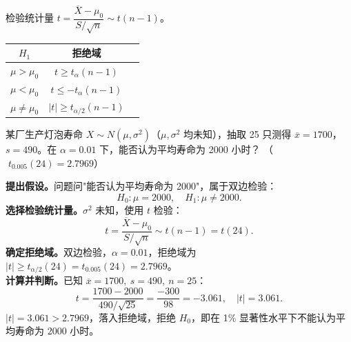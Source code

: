 ﻿\documentclass[lang=cn,11pt]{elegantbook}
\begin{document}
\begin{property}[t 检验（\(\sigma^2\) 未知）]\label{prop:t-test}
检验统计量 \(t = \dfrac{\overline{X}-\mu_0}{S/\sqrt{n}} \sim t(n-1)\)。
\begin{center}
\begin{tabular}{ccc}
\toprule
\(H_1\) & 拒绝域 \\
\midrule
\(\mu > \mu_0\) & \(t \geq t_\alpha(n-1)\) \\[4pt]
\(\mu < \mu_0\) & \(t \leq -t_\alpha(n-1)\) \\[4pt]
\(\mu \neq \mu_0\) & \(|t| \geq t_{\alpha/2}(n-1)\) \\
\bottomrule
\end{tabular}
\end{center}
\end{property}


\begin{exercise}\label{exer:9-t-test-two}
某厂生产灯泡寿命 \(X \sim N(\mu, \sigma^2)\)（\(\mu, \sigma^2\) 均未知），抽取 25 只测得 \(\overline{x}=1700\)，\(s=490\)。在 \(\alpha=0.01\) 下，能否认为平均寿命为 2000 小时？
（\(\;t_{0.005}(24)=2.7969\)）
\end{exercise}
\begin{solution}
\textbf{提出假设。}问题问"能否认为平均寿命为 2000"，属于双边检验：
\[
H_0\colon \mu = 2000,\quad H_1\colon \mu \neq 2000.
\]
\textbf{选择检验统计量。}\(\sigma^2\) 未知，使用 \(t\) 检验：
\[
t = \frac{\overline{X}-\mu_0}{S/\sqrt{n}} \sim t(n-1) = t(24).
\]
\textbf{确定拒绝域。}双边检验，\(\alpha=0.01\)，拒绝域为 \(|t| \geq t_{\alpha/2}(24) = t_{0.005}(24)=2.7969\)。\\
\textbf{计算并判断。}已知 \(\overline{x}=1700,\ s=490,\ n=25\)：
\[
t = \frac{1700-2000}{490/\sqrt{25}} = \frac{-300}{98} = -3.061,\quad |t| = 3.061.
\]
\(|t| = 3.061 > 2.7969\)，落入拒绝域，拒绝 \(H_0\)，即在 1\% 显著性水平下不能认为平均寿命为 2000 小时。
\end{solution}
\end{document}
